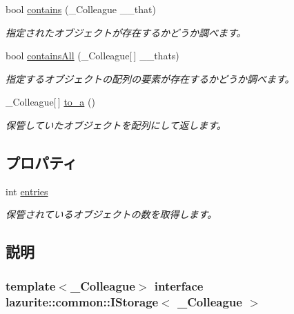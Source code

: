 \begin{DoxyCompactItemize}
bool \hyperlink{interfacelazurite_1_1common_1_1_i_storage_3_01___colleague_01_4_ab2f74d6daf8be72d92c6d0aa3f2abce8}{contains} (\_\-Colleague \_\-\_\-that)
\begin{DoxyCompactList}\small\item\em 指定されたオブジェクトが存在するかどうか調べます。 \item\end{DoxyCompactList}\item 
bool \hyperlink{interfacelazurite_1_1common_1_1_i_storage_3_01___colleague_01_4_a0b96167e28d2d2769ec81f74d7860dab}{containsAll} (\_\-Colleague\mbox{[}$\,$\mbox{]} \_\-\_\-thats)
\begin{DoxyCompactList}\small\item\em 指定するオブジェクトの配列の要素が存在するかどうか調べます。 \item\end{DoxyCompactList}\item 
\_\-Colleague\mbox{[}$\,$\mbox{]} \hyperlink{interfacelazurite_1_1common_1_1_i_storage_3_01___colleague_01_4_a408c3373a610fb7854b9bcb1d91d2f25}{to\_\-a} ()
\begin{DoxyCompactList}\small\item\em 保管していたオブジェクトを配列にして返します。 \item\end{DoxyCompactList}\end{DoxyCompactItemize}
\subsection*{プロパティ}
\begin{DoxyCompactItemize}
\item 
int \hyperlink{interfacelazurite_1_1common_1_1_i_storage_3_01___colleague_01_4_a107e0a83d66e920b9b6992feed32c4be}{entries}
\begin{DoxyCompactList}\small\item\em 保管されているオブジェクトの数を取得します。 \item\end{DoxyCompactList}\end{DoxyCompactItemize}


\subsection{説明}
\subsubsection*{template$<$\_\-Colleague$>$ interface lazurite::common::IStorage$<$ \_\-Colleague $>$}

